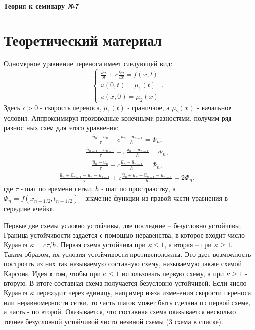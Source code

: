 \documentclass{report}
\newcommand{\seminarTitle}[1]{
    \begin{center}
        {\LARGE \bfseries #1}
    \end{center}
    \vspace{1em} 
}
\begin{document}
\seminarTitle{Теория к семинару №7}

\section*{Теоретический материал}
Одномерное уравнение переноса имеет следующий вид:
\begin{equation} \label{c7eq1}
    \begin{cases}
        \displaystyle \frac{\partial u}{\partial t} + c \frac{\partial u}{\partial x} = f(x,t) \\
        u(0,t) = \mu_1(t) \\
        u(x,0) = \mu_2(x)
    \end{cases}.
\end{equation}
Здесь $c > 0$ - скорость переноса, $\mu_1(t)$ - граничное, а $\mu_2(x)$ - начальное условия. Аппроксимируя производные конечными разностями, получим ряд разностных схем для этого уравнения:
\begin{align}
    \frac{\hat{u}_n - u_n}{\tau} + c \frac{u_n - u_{n-1}}{h} = \Phi_n, \label{c7eq2}
\end{align}
\begin{align}
    \frac{\hat{u}_{n-1} - u_{n-1}}{\tau} + c \frac{\hat{u}_n - \hat{u}_{n-1}}{h} = \Phi_n, \label{c7eq3}
\end{align}
\begin{align}
    \frac{\hat{u}_n - u_n}{\tau} +  c \frac{\hat{u}_n - \hat{u}_{n-1}}{h} = \Phi_n, \label{c7eq4}
\end{align}
\begin{align}
    \frac{\hat{u}_n + \hat{u}_{n-1} - u_n - u_{n-1}}{\tau} + c \frac{\hat{u}_n + u_n - \hat{u}_{n-1} - u_{n-1}}{h} = 2 \Phi_n, \label{c7eq5}
\end{align}
где $\tau$ - шаг по времени сетки, $h$ - шаг по пространству, а $\Phi_n = f(x_{n-1/2}, t_{n+1/2})$ - значение функции из правой части уравнения в середине ячейки.

Первые две схемы условно устойчивы, две последние – безусловно устойчивы. Граница устойчивости задается с помощью неравенства, в которое входит число Куранта $\kappa = c\tau/h$. Первая схема устойчива при $\kappa \leq 1$, а вторая – при $\kappa \geq 1$. Таким образом, их условия устойчивости противоположны. Это дает возможность построить из них так называемую составную схему, называемую также схемой Карсона. Идея в том, чтобы при $\kappa \leq 1$ использовать первую схему, а при $\kappa \geq 1$ - вторую. В итоге составная схема получается безусловно устойчивой. Если число Куранта $\kappa$ переходит через единицу, например из-за изменения скорости переноса или неравномерности сетки, то часть шагов может быть сделана по первой схеме, а часть - по второй. Оказывается, что составная схема оказывается несколько точнее безусловной устойчивой чисто неявной схемы (3 схема в списке).
\end{document}
